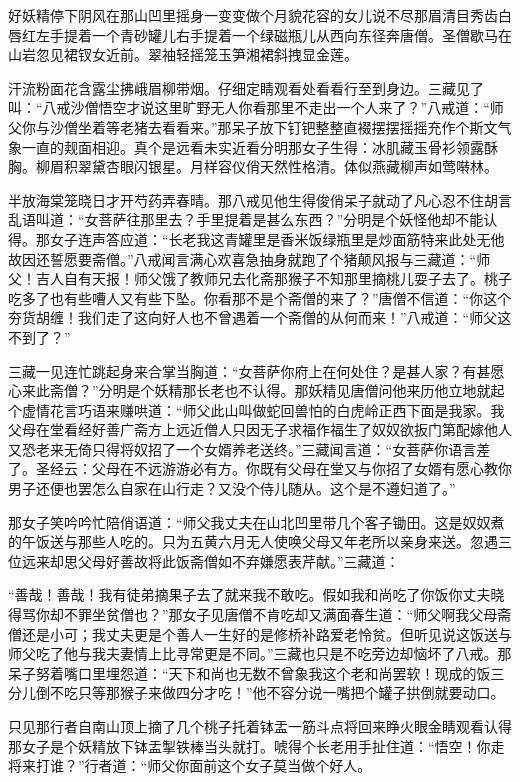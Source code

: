 \documentclass[12pt,UTF8]{ctexbook}
\begin{document}
好妖精停下阴风在那山凹里摇身一变变做个月貌花容的女儿说不尽那眉清目秀齿白唇红左手提着一个青砂罐儿右手提着一个绿磁瓶儿从西向东径奔唐僧。圣僧歇马在山岩忽见裙钗女近前。翠袖轻摇笼玉笋湘裙斜拽显金莲。

汗流粉面花含露尘拂峨眉柳带烟。仔细定睛观看处看看行至到身边。三藏见了叫：“八戒沙僧悟空才说这里旷野无人你看那里不走出一个人来了？”八戒道：“师父你与沙僧坐着等老猪去看看来。”那呆子放下钉钯整整直裰摆摆摇摇充作个斯文气象一直的觌面相迎。真个是远看未实近看分明那女子生得：冰肌藏玉骨衫领露酥胸。柳眉积翠黛杏眼闪银星。月样容仪俏天然性格清。体似燕藏柳声如莺啭林。

半放海棠笼晓日才开芍药弄春晴。那八戒见他生得俊俏呆子就动了凡心忍不住胡言乱语叫道：“女菩萨往那里去？手里提着是甚么东西？”分明是个妖怪他却不能认得。那女子连声答应道：“长老我这青罐里是香米饭绿瓶里是炒面筋特来此处无他故因还誓愿要斋僧。”八戒闻言满心欢喜急抽身就跑了个猪颠风报与三藏道：“师父！吉人自有天报！师父饿了教师兄去化斋那猴子不知那里摘桃儿耍子去了。桃子吃多了也有些嘈人又有些下坠。你看那不是个斋僧的来了？”唐僧不信道：“你这个夯货胡缠！我们走了这向好人也不曾遇着一个斋僧的从何而来！”八戒道：“师父这不到了？”

三藏一见连忙跳起身来合掌当胸道：“女菩萨你府上在何处住？是甚人家？有甚愿心来此斋僧？”分明是个妖精那长老也不认得。那妖精见唐僧问他来历他立地就起个虚情花言巧语来赚哄道：“师父此山叫做蛇回兽怕的白虎岭正西下面是我家。我父母在堂看经好善广斋方上远近僧人只因无子求福作福生了奴奴欲扳门第配嫁他人又恐老来无倚只得将奴招了一个女婿养老送终。”三藏闻言道：“女菩萨你语言差了。圣经云：父母在不远游游必有方。你既有父母在堂又与你招了女婿有愿心教你男子还便也罢怎么自家在山行走？又没个侍儿随从。这个是不遵妇道了。”

那女子笑吟吟忙陪俏语道：“师父我丈夫在山北凹里带几个客子锄田。这是奴奴煮的午饭送与那些人吃的。只为五黄六月无人使唤父母又年老所以亲身来送。忽遇三位远来却思父母好善故将此饭斋僧如不弃嫌愿表芹献。”三藏道：

“善哉！善哉！我有徒弟摘果子去了就来我不敢吃。假如我和尚吃了你饭你丈夫晓得骂你却不罪坐贫僧也？”那女子见唐僧不肯吃却又满面春生道：“师父啊我父母斋僧还是小可；我丈夫更是个善人一生好的是修桥补路爱老怜贫。但听见说这饭送与师父吃了他与我夫妻情上比寻常更是不同。”三藏也只是不吃旁边却恼坏了八戒。那呆子努着嘴口里埋怨道：“天下和尚也无数不曾象我这个老和尚罢软！现成的饭三分儿倒不吃只等那猴子来做四分才吃！”他不容分说一嘴把个罐子拱倒就要动口。

只见那行者自南山顶上摘了几个桃子托着钵盂一筋斗点将回来睁火眼金睛观看认得那女子是个妖精放下钵盂掣铁棒当头就打。唬得个长老用手扯住道：“悟空！你走将来打谁？”行者道：“师父你面前这个女子莫当做个好人。
\end{document}
